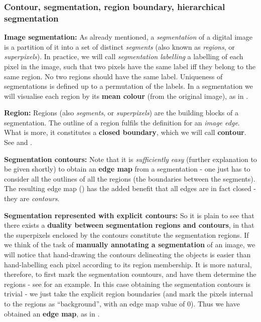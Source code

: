 \subsubsection{Contour, segmentation, region boundary, hierarchical segmentation}
\textbf{Image segmentation:} As already mentioned, a {\it segmentation} of a digital image is a partition of it into a set of distinct {\it segments} (also known as {\it regions}, or {\it superpixels}). In practice, we will call {\it segmentation labelling} a labelling of each pixel in the image, such that two pixels have the same label iff they belong to the same region. No two regions should have the same label. Uniqueness of segmentations is defined up to a permutation of the labels. In a segmentation we will visualise each region by its {\bf mean colour} (from the original image), as in .

\textbf{Region:} Regions (also {\it segments}, or {\it superpixels}) are the building blocks of a segmentation. The outline %
of a region fulfils the definition for an {\it image edge}. What is more, it constitutes a {\bf closed boundary}, which we will call {\bf contour}. See  and .

\textbf{Segmentation contours:} Note that it is {\it sufficiently easy} (further explanation to be given shortly) to obtain an {\bf edge map} from a segmentation - one just has to consider all the outlines of all the regions %
(the boundaries between the segments). The resulting edge map () has the added benefit that all edges are in fact closed - they are {\it contours}.

\textbf{Segmentation represented with explicit contours:} So it is plain to see that there exists a {\bf duality between segmentation regions and contours}, in that the superpixels enclosed by the contours constitute %
the segmentation regions. 
If we think of the task of {\bf manually annotating a segmentation} of an image, we will notice that hand-drawing the contours delineating the objects is easier than hand-labelling each pixel according to %
its region membership. It is more natural, therefore, to first mark %
the segmentation countours, and have them determine the regions - see  for an example. In this case obtaining the segmentation contours is trivial - we just take the explicit region boundaries (and mark the pixels internal to the regions as ``background'', with an edge map value of 0). Thus we have obtained an {\bf edge map}, as in .

